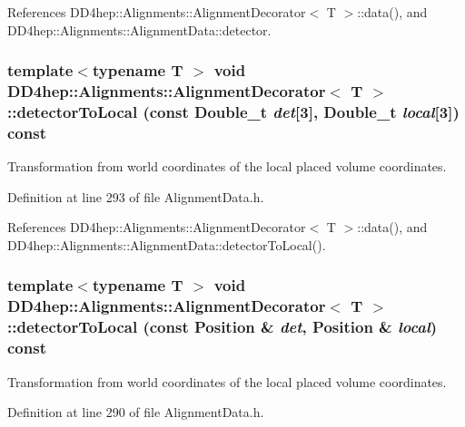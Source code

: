 References DD4hep::Alignments::AlignmentDecorator$<$ T $>$::data(), and DD4hep::Alignments::AlignmentData::detector.\hypertarget{class_d_d4hep_1_1_alignments_1_1_alignment_decorator_a98b0305066eca807a95104ad11302e4b}{
\subsubsection[{detectorToLocal}]{\setlength{\rightskip}{0pt plus 5cm}template$<$typename T $>$ void {\bf DD4hep::Alignments::AlignmentDecorator}$<$ {\bf T} $>$::detectorToLocal (const Double\_\-t {\em det}\mbox{[}3\mbox{]}, \/  Double\_\-t {\em local}\mbox{[}3\mbox{]}) const}}
\label{class_d_d4hep_1_1_alignments_1_1_alignment_decorator_a98b0305066eca807a95104ad11302e4b}


Transformation from world coordinates of the local placed volume coordinates. 

Definition at line 293 of file AlignmentData.h.

References DD4hep::Alignments::AlignmentDecorator$<$ T $>$::data(), and DD4hep::Alignments::AlignmentData::detectorToLocal().\hypertarget{class_d_d4hep_1_1_alignments_1_1_alignment_decorator_a11f53dac579af229135278a74abfd254}{
\subsubsection[{detectorToLocal}]{\setlength{\rightskip}{0pt plus 5cm}template$<$typename T $>$ void {\bf DD4hep::Alignments::AlignmentDecorator}$<$ {\bf T} $>$::detectorToLocal (const Position \& {\em det}, \/  Position \& {\em local}) const}}
\label{class_d_d4hep_1_1_alignments_1_1_alignment_decorator_a11f53dac579af229135278a74abfd254}


Transformation from world coordinates of the local placed volume coordinates. 

Definition at line 290 of file AlignmentData.h.

